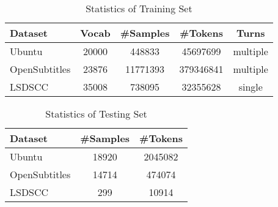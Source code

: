 \begin{table}[H]
    \centering
    \caption{Statistics of Training Set}
    \label{tab:StatisticsOfTrainingSet}
    \begin{tabular}{|l|*{4}{c|}}
        \hline
        Dataset & Vocab & \#Samples & \#Tokens & Turns \\
        \hline
        Ubuntu & 20000 & 448833 & 45697699 & multiple \\
        \hline
        OpenSubtitles & 23876 & 11771393 & 379346841 & multiple \\
        \hline
        LSDSCC & 35008 & 738095 & 32355628 & single \\
        \hline
    \end{tabular}
\end{table}

\begin{table}[H]
    \centering
    \caption{Statistics of Testing Set}
    \label{tab:StatisticsOfTestingSet}
    \begin{tabular}{|l|*{2}{c|}}
        \hline
        Dataset & \#Samples & \#Tokens \\
        \hline
        Ubuntu & 18920 & 2045082   \\
        \hline
        OpenSubtitles & 14714 & 474074 \\
        \hline
        LSDSCC & 299 & 10914 \\
        \hline
    \end{tabular}
\end{table}
